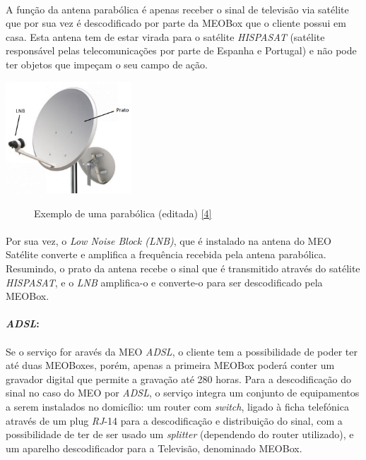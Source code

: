 \documentclass{report}
\begin{document}
\paragraph{}A função da antena parabólica é apenas receber o sinal de televisão via satélite que por sua vez é descodificado por parte da MEOBox que o cliente possui em casa. Esta antena tem de estar virada para o satélite \textit{HISPASAT} (satélite responsável pelas telecomunicações por parte de Espanha e Portugal) e não pode ter objetos que impeçam o seu campo de ação.

\begin{center}
\includegraphics[width=47mm]{Parabolica.pdf} 
\begin{figure}[h]
\caption{Exemplo de uma parabólica (editada) \href{https://img.pccomponentes.com/articles/2/22673/kit-antena-parabolica-60cm-lnb-soporte-pared-1.jpg}{[4]}}
\end{figure}
\end{center}

\paragraph{}Por sua vez, o \textit{Low Noise Block (LNB)}, que é instalado na antena do MEO Satélite converte e amplifica a frequência recebida pela antena parabólica. Resumindo, o prato da antena recebe o sinal que é transmitido através do satélite \textit{HISPASAT}, e o \textit{LNB} amplifica-o e converte-o para ser descodificado pela MEOBox.

\paragraph{\textit{ADSL}:}

\paragraph{}Se o serviço for aravés da MEO \textit{ADSL}, o cliente tem a possibilidade de poder ter até duas MEOBoxes, porém, apenas a primeira MEOBox poderá conter um gravador digital que permite a gravação até 280 horas. Para a descodificação do sinal no caso do MEO por \textit{ADSL}, o serviço integra um conjunto de equipamentos a serem instalados no domicílio: um router com \textit{switch}, ligado à ficha telefónica através de um plug \textit{RJ}-14 para a descodificação e distribuição do sinal, com a possibilidade de ter de ser usado um \textit{splitter} (dependendo do router utilizado), e um aparelho descodificador para a Televisão, denominado MEOBox. 
\end{document}
